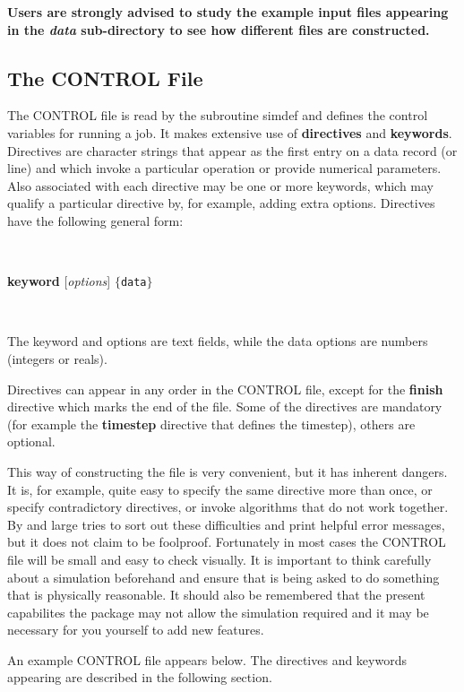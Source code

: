 {\bf Users are strongly advised to study the example input files
appearing in the {\em data} sub-directory to see how different files
are constructed.}

\subsection{The CONTROL File}
\label{controlfile}

The CONTROL file is read by the subroutine {\sc simdef} and defines
the control variables for running a \D{} job. It makes extensive use of
{\bf directives} and {\bf keywords}. Directives are character strings
that appear as the first entry on a data record (or line) and which
invoke a particular operation or provide numerical parameters. 
Also associated with each directive may be one or more keywords, which
may qualify a particular directive by, for example, adding extra
options.  
Directives have the following general form:

~

{\bf keyword} [{\em options}]  $\{${\tt data}$\}$

~

The keyword and options are text fields, while the data options
are numbers (integers or reals).


Directives can appear in any order in the CONTROL file,
except for the {\bf finish} directive which marks the end of the
file. Some of the directives are mandatory (for example the {\bf
timestep} directive that defines the timestep), others are optional.

This way of constructing the file is very convenient, but it has
inherent dangers. It is, for example, quite easy to specify the same
directive more than once, or specify contradictory directives, or
invoke algorithms that do not work together.  By and large
\D{} tries to sort out these difficulties and print helpful error
messages, but it does not claim to be foolproof. Fortunately in most
cases the CONTROL file will be small and easy to check visually. It is
important to think carefully about a simulation beforehand and ensure
that \D{} is being asked to do something that is physically reasonable. It
should also be remembered that the present capabilites the package may not
allow the simulation required and it may be necessary for you yourself
to add new features.

An example CONTROL file appears below. The directives and keywords
appearing are described in the following section.

